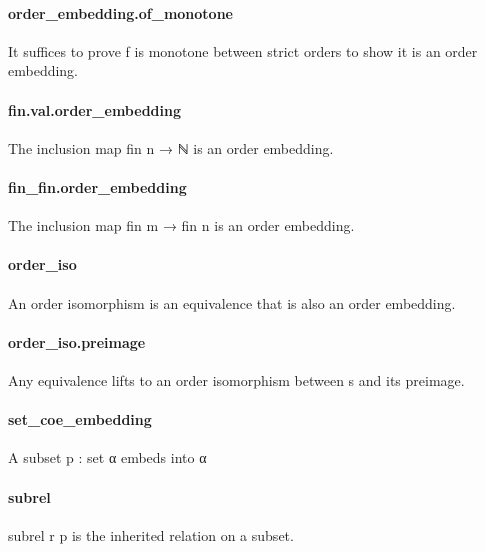 \documentclass{article}
\begin{document}
\paragraph{order\_embedding.of\_monotone}
\par
It suffices to prove 
\colorbox[RGB]{253,246,227}{{{{\color[RGB]{101, 123, 131} f }}}} is monotone between strict orders
to show it is an order embedding.
\paragraph{fin.val.order\_embedding}
\par
The inclusion map 
\colorbox[RGB]{253,246,227}{{{{\color[RGB]{101, 123, 131} fin n  }}}{{{\color[RGB]{133, 153, 0} → }}}{{{\color[RGB]{101, 123, 131}  ℕ }}}} is an order embedding.
\paragraph{fin\_fin.order\_embedding}
\par
The inclusion map 
\colorbox[RGB]{253,246,227}{{{{\color[RGB]{101, 123, 131} fin m  }}}{{{\color[RGB]{133, 153, 0} → }}}{{{\color[RGB]{101, 123, 131}  fin n }}}} is an order embedding.
\paragraph{order\_iso}
\par
An order isomorphism is an equivalence that is also an order embedding.
\paragraph{order\_iso.preimage}
\par
Any equivalence lifts to an order isomorphism between 
\colorbox[RGB]{253,246,227}{{{{\color[RGB]{101, 123, 131} s }}}} and its preimage.
\paragraph{set\_coe\_embedding}
\par
A subset 
\colorbox[RGB]{253,246,227}{{{{\color[RGB]{101, 123, 131} p : set α }}}} embeds into 
\colorbox[RGB]{253,246,227}{{{{\color[RGB]{101, 123, 131} α }}}}\paragraph{subrel}
\par
\colorbox[RGB]{253,246,227}{{{{\color[RGB]{101, 123, 131} subrel r p }}}} is the inherited relation on a subset.
\end{document}
